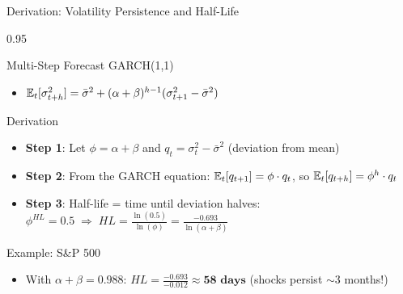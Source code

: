 \documentclass[9pt, aspectratio=169, t]{beamer}
\begin{document}
\begin{frame}{Derivation: Volatility Persistence and Half-Life}
    \begin{cminipage}{0.95\textwidth}
\small
    \begin{block}{Multi-Step Forecast GARCH(1,1)}
        \begin{itemize}\setlength{\itemsep}{0pt}
            \item $\mathbb{E}_t[\sigma_{t+h}^2] = \bar{\sigma}^2 + (\alpha+\beta)^{h-1}(\sigma_{t+1}^2 - \bar{\sigma}^2)$
        \end{itemize}
    \end{block}
    \vspace{-0.1cm}
    \begin{block}{Derivation}
        \begin{itemize}\setlength{\itemsep}{0pt}
            \item \textbf{Step 1}: Let $\phi = \alpha + \beta$ and $q_t = \sigma_t^2 - \bar{\sigma}^2$ (deviation from mean)
            \item \textbf{Step 2}: From the GARCH equation: $\mathbb{E}_t[q_{t+1}] = \phi \cdot q_t$, so $\mathbb{E}_t[q_{t+h}] = \phi^h \cdot q_t$
            \item \textbf{Step 3}: Half-life = time until deviation halves:
            $\phi^{HL} = 0.5 \;\Rightarrow\; HL = \frac{\ln(0.5)}{\ln(\phi)} = \frac{-0.693}{\ln(\alpha+\beta)}$
        \end{itemize}
    \end{block}
    \vspace{-0.1cm}
    \begin{exampleblock}{Example: S\&P 500}
        \begin{itemize}\setlength{\itemsep}{0pt}
            \item With $\alpha + \beta = 0.988$: $HL = \frac{-0.693}{-0.012} \approx \textbf{58 days}$ (shocks persist $\sim$3 months!)
        \end{itemize}
    \end{exampleblock}
    \end{cminipage}
\end{frame}
\end{document}
